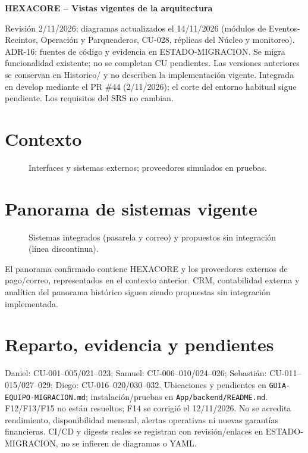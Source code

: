 \documentclass[12pt,a4paper]{article}
\begin{document}
\sloppy
\begin{center}\LARGE\textbf{HEXACORE -- Vistas vigentes de la arquitectura}\end{center}
\noindent Revisión 2/11/2026; diagramas actualizados el 14/11/2026 (módulos de Eventos-Recintos, Operación y Parqueaderos, CU-028, réplicas del Núcleo y monitoreo). ADR-16; fuentes de código y evidencia en ESTADO-MIGRACION.
Se migra funcionalidad existente; no se completan CU pendientes. Las versiones anteriores
se conservan en Historico/ y no describen la implementación vigente. Integrada en develop mediante el PR \#44
(2/11/2026); el corte del entorno habitual sigue pendiente. Los requisitos del SRS no cambian.
\tableofcontents
\section{Contexto}
\begin{figure}[H]\centering\HexContexto\caption{Interfaces y sistemas externos; proveedores simulados en pruebas.}\end{figure}
\section{Panorama de sistemas vigente}
\begin{figure}[H]\centering\HexPanorama\caption{Sistemas integrados (pasarela y correo) y propuestos sin integración (línea discontinua).}\end{figure}
El panorama confirmado contiene HEXACORE y los proveedores externos de pago/correo,
representados en el contexto anterior. CRM, contabilidad externa y analítica del
panorama histórico siguen siendo propuestas sin integración implementada.

\section{Reparto, evidencia y pendientes}
Daniel: CU-001--005/021--023; Samuel: CU-006--010/024--026; Sebastián:
CU-011--015/027--029; Diego: CU-016--020/030--032. Ubicaciones y pendientes en
\texttt{GUIA-EQUIPO-MIGRACION.md}; instalación/pruebas en \texttt{App/backend/README.md}.
F12/F13/F15 no están resueltos; F14 se corrigió el 12/11/2026. No se acredita rendimiento, disponibilidad mensual,
alertas operativas ni nuevas garantías financieras. CI/CD y digests reales se registran
con revisión/enlaces en ESTADO-MIGRACION, no se infieren de diagramas o YAML.
\end{document}
